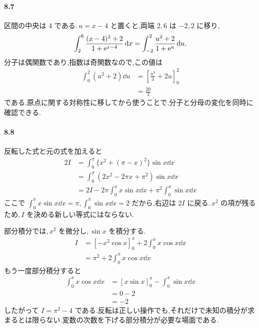 \paragraph{8.7}
区間の中央は $4$ である.\,$u=x-4$ と置くと,両端 $2,6$ は $-2,2$ に移り,
\[
\int_2^6\frac{(x-4)^2+2}{1+\mathrm{e}^{x-4}}\,\mathrm{d} x
 =\int_{-2}^2\frac{u^2+2}{1+\mathrm{e}^u}\,\mathrm{d} u.
\]
分子は偶関数であり,指数は奇関数なので,この値は
\[
\begin{aligned}
\int_0^2(u^2+2)\dd u
 &=\left[\frac{u^3}{3}+2u\right]_0^2\\
 &=\frac{20}{3}
\end{aligned}
\]
である.原点に関する対称性に移してから使うことで,分子と分母の変化を同時に確認できる.

\paragraph{8.8}
反転した式と元の式を加えると
\[
\begin{aligned}
2I&=\int_0^\pi\{x^2+(\pi-x)^2\}\sin x\dd x\\
 &=\int_0^\pi(2x^2-2\pi x+\pi^2)\sin x\dd x\\
 &=2I-2\pi\int_0^\pi x\sin x\dd x
  +\pi^2\int_0^\pi\sin x\dd x
\end{aligned}
\]
ここで $\int_0^\pi x\sin x\dd x=\pi$,\,$\int_0^\pi\sin x\dd x=2$ だから,右辺は $2I$ に戻る.\,$x^2$ の項が残るため,\,$I$ を決める新しい等式にはならない.

部分積分では,\,$x^2$ を微分し,\,$\sin x$ を積分する.
\[
\begin{aligned}
I&=\left[-x^2\cos x\right]_0^\pi
  +2\int_0^\pi x\cos x\dd x\\
 &=\pi^2+2\int_0^\pi x\cos x\dd x
\end{aligned}
\]
もう一度部分積分すると
\[
\begin{aligned}
\int_0^\pi x\cos x\dd x
 &=\left[x\sin x\right]_0^\pi-\int_0^\pi\sin x\dd x\\
 &=0-2\\
 &=-2
\end{aligned}
\]
したがって $I=\pi^2-4$ である.反転は正しい操作でも,それだけで未知の積分が求まるとは限らない.変数の次数を下げる部分積分が必要な場面である.
